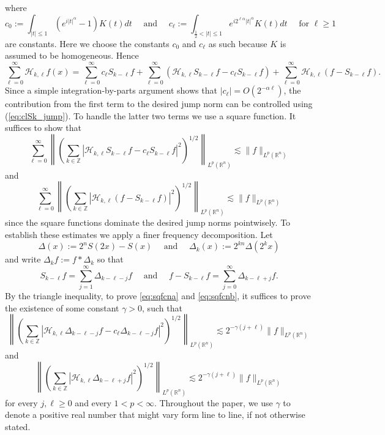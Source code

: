 \documentclass[12pt,leqno]{amsart}
\def\R{\mathbb{R}}
\def\Z{\mathbb{Z}}
\theoremstyle{plain}
\numberwithin{equation}{section}
\begin{document}
where
\begin{equation} \label{eq:c_alpha_ell_def}
c_0 := \int_{|t| \leq 1} (e^{i |t|^{\alpha}} - 1) K(t)dt \quad \text{ and } \quad c_{\ell} := \int_{\frac{1}{2} < |t| \leq 1} e^{i 2^{\ell \alpha} |t|^{\alpha}} K(t)dt \quad \text{ for }\ell \ge 1
\end{equation}
are constants. Here we choose the constants $c_0$ and $c_{\ell}$ as such because  $K$ is assumed to be homogeneous. Hence
\[
\sum_{\ell =0}^{\infty}\mathcal{H}_{k,\ell } f(x)=
\sum_{\ell = 0}^{\infty} c_{\ell} S_{k-\ell} f 
+ \sum_{\ell=0}^{\infty} \left(\mathcal{H}_{k,\ell} S_{k-\ell} f 
-  c_{\ell} S_{k-\ell} f \right) + \sum_{\ell=0}^{\infty} \mathcal{H}_{k,\ell} (f - S_{k-\ell} f).
\]
Since a simple integration-by-parts argument shows that $|c_{\ell}| = O(2^{-\alpha \ell})$, the contribution from the first term to the desired jump norm can be controlled using (\ref{eq:clSk_jump}). To handle the latter two terms we use a square function. It suffices to show that
\begin{equation} \label{eq:sqfcna}
\sum_{\ell = 0}^{\infty} \left \| \left ( \sum_{k \in \Z}  |\mathcal{H}_{k,\ell} S_{k-\ell} f 
-  c_{\ell} S_{k-\ell} f |^2 \right )^{1/2} \right \|_{L^p(\R^n)} \lesssim \|f\|_{L^p(\R^n)}
\end{equation}
and
\begin{equation} \label{eq:sqfcnb}
\sum_{\ell = 0}^{\infty} \left \| \left ( \sum_{k \in \Z} | \mathcal{H}_{k,\ell} (f - S_{k-\ell} f)|^2 \right )^{1/2} \right \|_{L^p(\R^n)} \lesssim \|f\|_{L^p(\R^n)}
\end{equation}
since the square functions dominate the desired jump norms pointwisely.
To establish these estimates we apply a finer frequency decomposition. Let 
\[
\Delta(x) := 2^n S(2x) - S(x) \quad \text{ and } \quad \Delta_k(x) := 2^{kn} \Delta(2^k x)
\]
and write $\Delta_k f := f*\Delta_k$ so that
\[
S_{k-\ell} f = \sum_{j=1}^{\infty} \Delta_{k-\ell-j} f \quad \text{ and } \quad f - S_{k-\ell} f = \sum_{j=0}^{\infty} \Delta_{k-\ell+j} f.
\]
By the triangle inequality, to prove \eqref{eq:sqfcna} and \eqref{eq:sqfcnb}, it suffices to prove the existence of some constant $\gamma > 0$, such that
\begin{equation} \label{eq:HklSkdiff_sq_fnc_Delta}
\left\| \left( \sum_{k \in \Z} \left|\mathcal{H}_{k,\ell} \Delta_{k-\ell-j} f - c_{\ell} \Delta_{k-\ell-j} f  \right|^2 \right)^{1/2} \right\|_{L^p(\R^n)} \lesssim 2^{-\gamma(j+\ell)} \|f\|_{L^p(\R^n)}
\end{equation}
and
\begin{equation} \label{eq:Hklfdiff_sq_fnc_Delta}
\left\| \left( \sum_{k \in \Z} \left| \mathcal{H}_{k,\ell} \Delta_{k-\ell+j} f \right|^2 \right)^{1/2} \right\|_{L^p(\R^n)} \lesssim 2^{-\gamma (j+\ell)} \|f\|_{L^p(\R^n)}
\end{equation}
for every $j, \ell \geq 0$ and every $1 < p < \infty$. Throughout the paper, we use $\gamma$ to denote a positive real number that might vary form line to line, if not otherwise stated.\\
\end{document}
